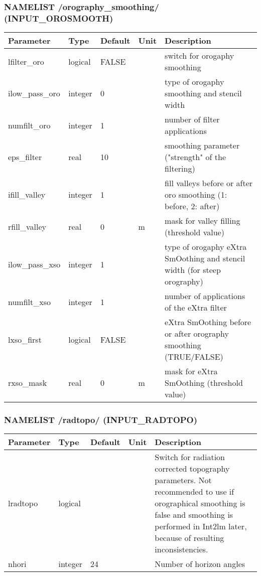 \documentclass[a4paper,10pt,DIV14,BCOR1cm,titlepage,twoside]{scrartcl}
\providecommand{\tabularnewline}{\\}
\begin{document}
\subsubsection*{NAMELIST /orography\_smoothing/ (INPUT\_OROSMOOTH)}
\begin{longtable}{|p{4cm}|p{1.5cm}|p{1.5cm}|p{1cm}|p{6cm}|}
\hline 
\textbf{Parameter}& \textbf{Type}& \textbf{Default}& \textbf{Unit}& \textbf{Description}
\tabularnewline
\hline
\endhead
\hline
lfilter\_oro & logical & FALSE &  & switch for orogaphy smoothing
\tabularnewline
\hline 
ilow\_pass\_oro & integer & 0 &  & type of orogaphy smoothing and stencil width
\tabularnewline
\hline 
numfilt\_oro & integer & 1 &  & number of filter applications 
\tabularnewline
\hline 
eps\_filter & real & 10 &  & smoothing parameter ("strength" of the filtering)
\tabularnewline
\hline 
ifill\_valley & integer & 1 &  & fill valleys before or after oro smoothing (1: before, 2: after)
\tabularnewline
\hline 
rfill\_valley & real & 0 & m &  mask for valley filling (threshold value)
\tabularnewline
\hline 
ilow\_pass\_xso & integer & 1 &  & type of orogaphy eXtra SmOothing and stencil width (for steep orography)
\tabularnewline
\hline 
numfilt\_xso & integer & 1 &  & number of applications of the eXtra filter
\tabularnewline
\hline 
lxso\_first & logical & FALSE &  & eXtra SmOothing before or after orography smoothing (TRUE/FALSE)
\tabularnewline
\hline
rxso\_mask & real & 0 & m &  mask for eXtra SmOothing (threshold value)
\tabularnewline
\hline
\bottomrule
\end{longtable}

\subsubsection*{NAMELIST /radtopo/ (INPUT\_RADTOPO)}
\begin{longtable}{|p{4cm}|p{1.5cm}|p{1.5cm}|p{1cm}|p{6cm}|}
\hline 
\textbf{Parameter}& \textbf{Type}& \textbf{Default}& \textbf{Unit}& \textbf{Description}
\tabularnewline
\hline
\endhead
\hline
lradtopo & logical & & & Switch for radiation corrected topography parameters. Not recommended to use if orographical smoothing is false and smoothing is performed in Int2lm later, because of resulting inconsistencies.\tabularnewline\hline
nhori    & integer & 24 & & Number of horizon angles
\tabularnewline
\hline
\bottomrule
\end{longtable}
\end{document}
